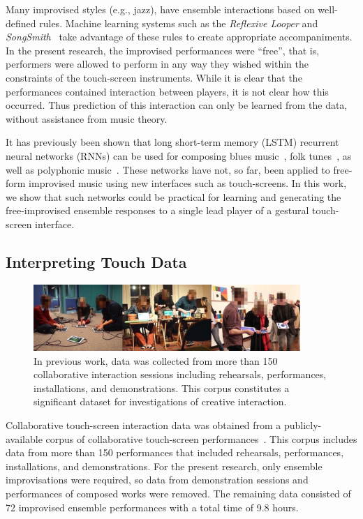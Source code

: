 \documentclass{article}
\begin{document}
Many improvised styles (e.g., jazz), have ensemble interactions based
on well-defined rules. Machine learning systems such as the
\emph{Reflexive Looper}\cite{Pachet:2013kq} and
\emph{SongSmith}~\cite{Morris:2008qe} take advantage of these rules to
create appropriate accompaniments. In the present research, the
improvised performances were ``free'', that is, performers were
allowed to perform in any way they wished within the constraints of
the touch-screen instruments. While it is clear that the performances
contained interaction between players, it is not clear how this
occurred. Thus prediction of this interaction can only be learned from
the data, without assistance from music theory.

It has previously been shown that long short-term memory (LSTM)
recurrent neural networks (RNNs) can be used for composing blues
music~\cite{Eck:2007rw}, folk tunes~\cite{Sturm:2016rz}, as well as
polyphonic music~\cite{Walder:2016le}. These networks have not, so
far, been applied to free-form improvised music using new interfaces
such as touch-screens. In this work, we show that such networks could
be practical for learning and generating the free-improvised ensemble
responses to a single lead player of a gestural touch-screen
interface.

\subsection{Interpreting Touch Data}

\begin{figure}
  \centering
  \includegraphics[width=0.9\textwidth]{three-performance-contexts}
  \caption{In previous work, data was collected from more than 150
    collaborative interaction sessions including rehearsals,
    performances, installations, and demonstrations. This corpus
    constitutes a significant dataset for investigations of
    creative interaction.}\label{fig:performance-contexts}
\end{figure}

Collaborative touch-screen interaction data was obtained from a
publicly-available corpus of collaborative touch-screen
performances~\cite{Martin:2016fc}. This corpus includes data from more
than 150 performances that included rehearsals, performances,
installations, and demonstrations. For the present research, only
ensemble improvisations were required, so data from demonstration
sessions and performances of composed works were removed. The
remaining data consisted of 72 improvised ensemble performances with a
total time of 9.8 hours.
\end{document}

